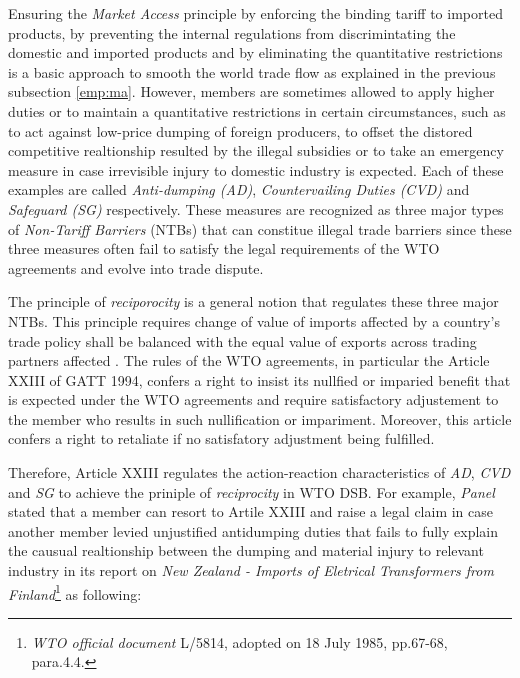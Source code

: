 Ensuring the \textit{Market Access} principle 
by enforcing
the binding tariff to imported products, by preventing the internal regulations from discrimintating the domestic and imported products
and by eliminating the quantitative restrictions
is a basic approach to smooth the world trade flow as explained in the previous subsection \ref{emp:ma}. 
However, members are sometimes allowed to apply higher duties or to maintain a quantitative restrictions in certain circumstances, such as 
to act against low-price dumping of foreign producers, to offset the distored competitive realtionship resulted by the illegal subsidies
or to take an emergency measure in case irrevisible injury to domestic industry is expected. Each of these examples 
are called \textit{Anti-dumping (AD)}, \textit{Countervailing Duties (CVD)} and \textit{Safeguard (SG)} respectively. These measures are recognized as 
three major types of \textit{Non-Tariff Barriers} (NTBs) that can constitue illegal trade barriers
since these three measures often fail to satisfy the legal requirements of the WTO agreements and evolve into trade dispute.

The principle of \textit{reciporocity} is a general notion that regulates these three major NTBs.
This principle requires change of value of imports affected by a country's trade policy 
shall be balanced with the equal value of exports across trading partners affected \citep{bagwell1999}.
The rules of the WTO agreements, in particular the Article XXIII of GATT 1994, 
confers a right to insist its nullfied or imparied benefit that is expected under the WTO agreements and require satisfactory adjustement to the member 
who results in such nullification or impariment. Moreover, this article confers a right to retaliate if no satisfatory adjustment being fulfilled.

Therefore, Article XXIII regulates the action-reaction characteristics of \textit{AD}, \textit{CVD} and \textit{SG} to achieve the priniple of \textit{reciprocity} in WTO DSB. %
For example, \textit{Panel} stated that a member can resort to Artile XXIII and raise a legal claim in case another member levied unjustified antidumping duties that fails to fully explain the causual realtionship between the dumping and material injury to relevant industry in its report on \textit{New Zealand - Imports of Eletrical Transformers from Finland}\footnote{\textit{WTO official document} L/5814, adopted on 18 July 1985, pp.67-68, para.4.4.} as following:

